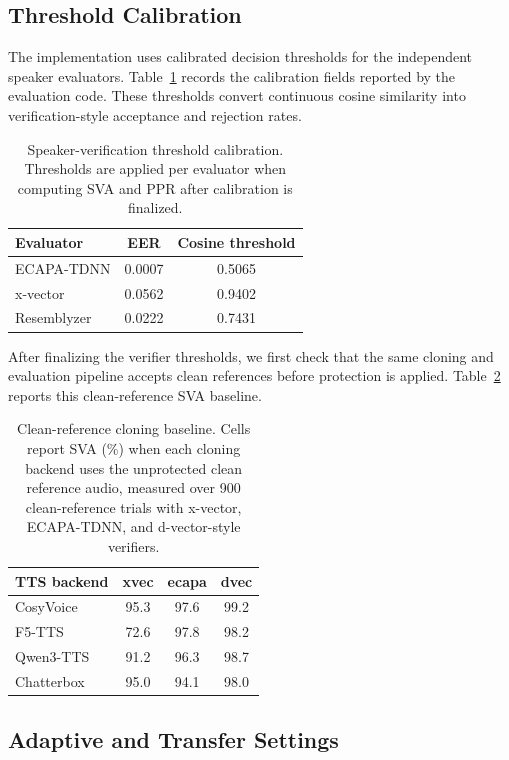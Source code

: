 \subsection{Threshold Calibration}

The implementation uses calibrated decision thresholds for the independent speaker evaluators. 
Table~\ref{tab:thresholds} records the calibration fields reported by the evaluation code. 
These thresholds convert continuous cosine similarity into verification-style acceptance and rejection rates.

\begin{table}[t]
\centering
\small
\begin{tabular}{lcc}
\toprule
Evaluator & EER & Cosine threshold \\
\midrule
ECAPA-TDNN & 0.0007 & 0.5065 \\
x-vector & 0.0562 & 0.9402 \\
Resemblyzer & 0.0222 & 0.7431 \\
\bottomrule
\end{tabular}
\caption{Speaker-verification threshold calibration. 
Thresholds are applied per evaluator when computing SVA and PPR after calibration is finalized.}
\label{tab:thresholds}
\end{table}

After finalizing the verifier thresholds, we first check that the same cloning and evaluation pipeline accepts clean references before protection is applied. 
Table~\ref{tab:clean_sva} reports this clean-reference SVA baseline.

\begin{table}[t]
\centering
\small
\setlength{\tabcolsep}{5pt}
\begin{tabular}{lccc}
\toprule
TTS backend & xvec & ecapa & dvec \\
\midrule
CosyVoice & 95.3 & 97.6 & 99.2 \\
F5-TTS & 72.6 & 97.8 & 98.2 \\
Qwen3-TTS & 91.2 & 96.3 & 98.7 \\
Chatterbox & 95.0 & 94.1 & 98.0 \\
\bottomrule
\end{tabular}
\caption{Clean-reference cloning baseline. 
Cells report SVA (\%) when each cloning backend uses the unprotected clean reference audio, measured over 900 clean-reference trials with x-vector, ECAPA-TDNN, and d-vector-style verifiers.}
\label{tab:clean_sva}
\end{table}

\subsection{Adaptive and Transfer Settings}

